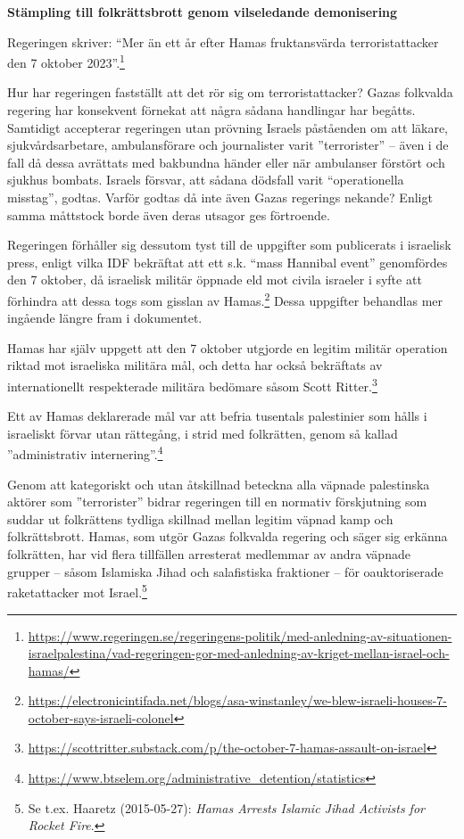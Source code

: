 \textbf{Stämpling till folkrättsbrott genom vilseledande demonisering}

Regeringen skriver: \enquote{Mer än ett år efter Hamas fruktansvärda terroristattacker den 7 oktober 2023}.\footnote{\url{https://www.regeringen.se/regeringens-politik/med-anledning-av-situationen-israelpalestina/vad-regeringen-gor-med-anledning-av-kriget-mellan-israel-och-hamas/}}

Hur har regeringen fastställt att det rör sig om terroristattacker? 
Gazas folkvalda regering har konsekvent förnekat att några sådana handlingar har begåtts. 
Samtidigt accepterar regeringen utan prövning Israels påståenden om att läkare, sjukvårdsarbetare,
ambulansförare och journalister varit ”terrorister” – även i de fall då dessa avrättats med bakbundna händer 
eller när ambulanser förstört och sjukhus bombats. 
Israels försvar, att sådana dödsfall varit \enquote{operationella misstag}, godtas. 
Varför godtas då inte även Gazas regerings nekande? Enligt samma måttstock borde även deras utsagor ges förtroende.

Regeringen förhåller sig dessutom tyst till de uppgifter som publicerats i israelisk press, 
enligt vilka IDF bekräftat att ett s.k. \enquote{mass Hannibal event} genomfördes den 7 oktober, 
då israelisk militär öppnade eld mot civila israeler i syfte att förhindra att dessa togs som 
gisslan av Hamas.\footnote{\url{https://electronicintifada.net/blogs/asa-winstanley/we-blew-israeli-houses-7-october-says-israeli-colonel}} Dessa uppgifter behandlas mer ingående längre fram i dokumentet.

Hamas har själv uppgett att den 7 oktober utgjorde en legitim militär operation riktad mot israeliska militära mål, 
och detta har också bekräftats av internationellt respekterade militära bedömare såsom 
Scott Ritter.\footnote{\url{https://scottritter.substack.com/p/the-october-7-hamas-assault-on-israel}} 

Ett av Hamas deklarerade mål var att befria tusentals palestinier som hålls i israeliskt förvar utan rättegång, 
i strid med folkrätten, genom så kallad ”administrativ internering”.\footnote{\url{https://www.btselem.org/administrative_detention/statistics}}

Genom att kategoriskt och utan åtskillnad beteckna alla väpnade palestinska aktörer som ”terrorister” 
bidrar regeringen till en normativ förskjutning som suddar ut folkrättens tydliga skillnad mellan legitim väpnad kamp och folkrättsbrott. 
Hamas, som utgör Gazas folkvalda regering och säger sig erkänna folkrätten, 
har vid flera tillfällen arresterat medlemmar av andra väpnade grupper – såsom Islamiska Jihad 
och salafistiska fraktioner – för oauktoriserade raketattacker 
mot Israel.\footnote{Se t.ex. Haaretz (2015-05-27): \textit{Hamas Arrests Islamic Jihad Activists for Rocket Fire}.}

